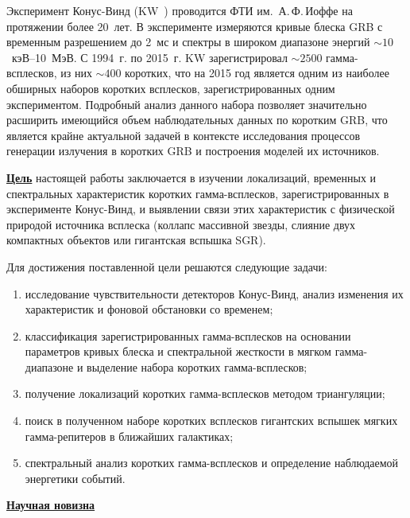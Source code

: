 Эксперимент Конус-Винд (KW~\citep{Aptekar_1995SSR}) проводится ФТИ им.~А.\,Ф.\,Иоффе 
на протяжении более 20~лет. В эксперименте измеряются кривые блеска GRB с временным 
разрешением до 2~мс и спектры в широком диапазоне энергий $\sim 10$~кэВ--10~МэВ. 
С 1994~г. по 2015~г. KW зарегистрировал $\sim 2500$ гамма-всплесков,
из них $\sim 400$ коротких, что на 2015 год является 
одним из наиболее обширных наборов коротких всплесков, зарегистрированных 
одним экспериментом. Подробный анализ данного набора позволяет значительно расширить 
имеющийся объем наблюдательных данных по коротким GRB, что является крайне актуальной 
задачей в контексте исследования процессов генерации излучения в коротких GRB 
и построения моделей их источников.

\underline{\textbf{Цель}} настоящей работы заключается в изучении локализаций, 
временных и спектральных характеристик коротких гамма-всплесков, 
зарегистрированных в эксперименте Конус-Винд, и выявлении 
связи этих характеристик с физической природой источника всплеска 
(коллапс массивной звезды, слияние двух компактных объектов или гигантская вспышка SGR).

Для достижения поставленной цели решаются следующие задачи:
\begin{enumerate}
\item исследование чувствительности детекторов Конус-Винд, анализ изменения 
их характеристик и фоновой обстановки со временем;
\item классификация зарегистрированных гамма-всплесков на основании параметров 
кривых блеска и спектральной жесткости в мягком гамма-диапазоне и выделение набора коротких гамма-всплесков; 
\item получение локализаций коротких гамма-всплесков методом триангуляции; 
\item поиск в полученном наборе коротких всплесков гигантских 
вспышек мягких гамма-репитеров в ближайших галактиках;
\item спектральный анализ коротких гамма-всплесков и определение наблюдаемой энергетики событий.
\end{enumerate}

\underline{\textbf{Научная новизна}}

